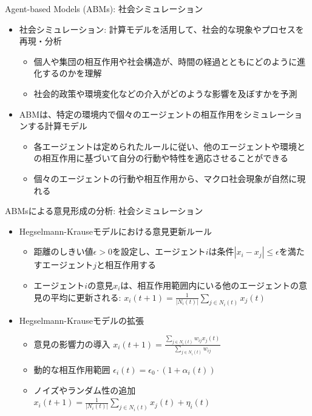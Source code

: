 \documentclass{beamer}
\begin{document}
    \begin{frame}{Agent-based Models (ABMs)}{\secname : 社会シミュレーション}
    \begin{itemize}
        \item 社会シミュレーション: 計算モデルを活用して、社会的な現象やプロセスを再現・分析
        \begin{itemize}
            \item 個人や集団の相互作用や社会構造が、時間の経過とともにどのように進化するのかを理解
            \item  社会的政策や環境変化などの介入がどのような影響を及ぼすかを予測
        \end{itemize}
    \end{itemize}
    \pause
    \begin{itemize}
        \item ABMは、特定の環境内で個々のエージェントの相互作用をシミュレーションする計算モデル
        \begin{itemize}
        \item 各エージェントは定められたルールに従い、他のエージェントや環境との相互作用に基づいて自分の行動や特性を適応させることができる
        \item 個々のエージェントの行動や相互作用から、マクロ社会現象が自然に現れる
        \end{itemize}
    \end{itemize}
    \end{frame}

    \begin{frame}{ABMsによる意見形成の分析}{\secname : 社会シミュレーション}

    \begin{itemize}
        \item Hegselmann-Krauseモデルにおける意見更新ルール
        \begin{itemize}
            \item 距離のしきい値$\epsilon>0$を設定し、エージェント$i$は条件$|x_i - x_j| \leq \epsilon$を満たすエージェント$j$と相互作用する
            \item エージェント$i$の意見$x_i$は、相互作用範囲内にいる他のエージェントの意見の平均に更新される: $x_i(t+1) = \frac{1}{|N_i(t)|} \sum_{j \in N_i(t)} x_j(t)$
        \end{itemize}
        \pause
        \item Hegselmann-Krauseモデルの拡張
        \begin{itemize}
            \item 意見の影響力の導入 $x_i(t+1) = \frac{\sum_{j \in N_i(t)} w_{ij} x_j(t)}{\sum_{j \in N_i(t)} w_{ij}}$
            \item 動的な相互作用範囲 $\epsilon_i(t) = \epsilon_0 \cdot (1 + \alpha_i(t))$
            \item ノイズやランダム性の追加 $x_i(t+1) = \frac{1}{|N_i(t)|} \sum_{j \in N_i(t)} x_j(t) + \eta_i(t)$
        \end{itemize}
    \end{itemize}
 
    \end{frame}
\end{document}
